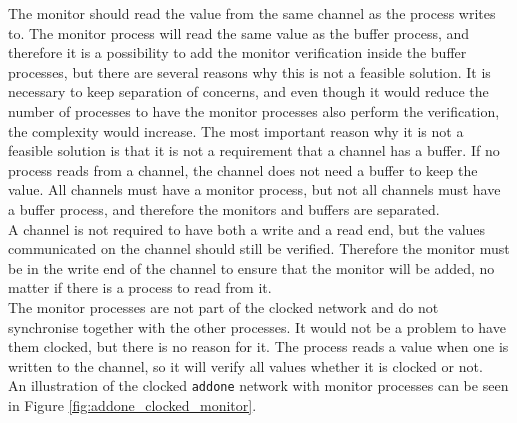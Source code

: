 The monitor should read the value from the same channel as the process writes to. The monitor process will read the same value as the buffer process, and therefore it is a possibility to add the monitor verification inside the buffer processes, but there are several reasons why this is not a feasible solution. It is necessary to keep separation of concerns, and even though it would reduce the number of processes to have the monitor processes also perform the verification, the complexity would increase. The most important reason why it is not a feasible solution is that it is not a requirement that a channel has a buffer. If no process reads from a channel, the channel does not need a buffer to keep the value. All channels must have a monitor process, but not all channels must have a buffer process, and therefore the monitors and buffers are separated.\\

A channel is not required to have both a write and a read end, but the values communicated on the channel should still be verified. Therefore the monitor must be in the write end of the channel to ensure that the monitor will be added, no matter if there is a process to read from it. \\

The monitor processes are not part of the clocked network and do not synchronise together with the other processes. It would not be a problem to have them clocked, but there is no reason for it. The process reads a value when one is written to the channel, so it will verify all values whether it is clocked or not.\\

An illustration of the clocked \texttt{addone} network with monitor processes can be seen in Figure \ref{fig:addone_clocked_monitor}.


